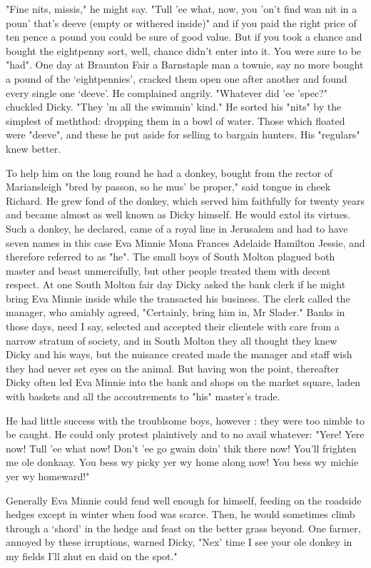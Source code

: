 "Fine nits, missis," he might say. "Tull 'ee what, now, you 'on't find wan nit in a poun' that's deeve (empty or withered inside)"   and if you paid the right price of ten pence a pound you could be sure of good value. But if you took a chance and bought the eightpenny sort, well, chance didn't enter into it. You were sure to be "had". One day at Braunton Fair a Barnstaple man   a townie, say no more   bought a pound of the ‘eightpennies’, cracked them open one after another and found every single one ‘deeve’.
 He complained angrily.
 "Whatever did 'ee 'spec?" chuckled Dicky. "They 'm all the swimmin' kind." He sorted his "nits" by the simplest of meththod: dropping them in a bowl of water. Those which floated were "deeve", and these he put aside for selling to bargain hunters. His "regulars" knew better.

To help him on the long round he had a donkey, bought from the rector of Mariansleigh   "bred by passon, so he mus' be proper," said tongue in cheek Richard. He grew fond of the donkey, which served him faithfully for twenty years and became almost as well known as Dicky himself. He would extol its virtues. Such a donkey, he declared, came of a royal line in Jerusalem and had to have seven names   in this case Eva Minnie Mona Frances Adelaide Hamilton Jessie, and therefore referred to as "he". The small boys of South Molton plagued both master and beast unmercifully, but other people treated them with decent respect. At one South Molton fair day Dicky asked the bank clerk if he might bring Eva Minnie inside while the transacted his business. The clerk called the manager, who amiably agreed, "Certainly, bring him in, Mr Slader." Banks in those days, need I say, selected and accepted their clientele with care from a narrow stratum of society, and in South Molton they all thought they knew Dicky and his ways, but the nuisance created made the manager and staff wish they had never set eyes on the animal. But having won the point, thereafter Dicky often led Eva Minnie into the bank and shops on the market square, laden with baskets and all the accoutrements to "his" master's trade.

He had little success with the troublsome boys, however : they were too nimble to be caught. He could only protest plaintively and to no avail whatever: "Yere! Yere now! Tull 'ee what now! Don't 'ee go gwain doin' thik there now! You'll frighten me ole donkaay. You bess wy picky yer wy home along now! You bess wy michie yer wy homeward!"

Generally Eva Minnie could fend well enough for himself, feeding on the roadside hedges except in winter when food was scarce. Then, he would sometimes climb through a ‘shord’ in the hedge and feast on the better grass beyond. One farmer, annoyed by these irruptions, warned Dicky, "Nex' time I see your ole donkey in my fields I'll zhut en daid on the spot."

